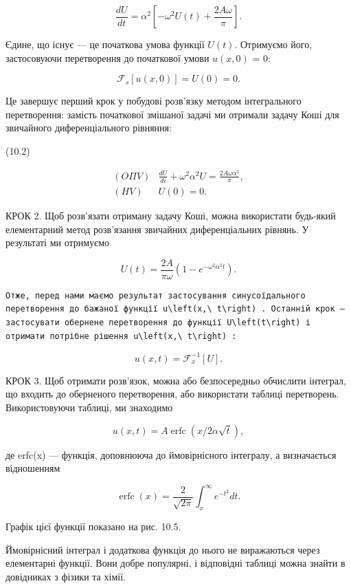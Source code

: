 \documentclass[
  ukrainian,
]{article}
\begin{document}
\[
\frac{dU}{dt} = \alpha^2 \left[ -\omega^2 U(t) + \frac{2A\omega}{\pi} \right].
\]

Єдине, що існує --- це початкова умова функції \(U(t)\). Отримуємо його,
застосовуючи перетворення до початкової умови \(u(x, 0)\) = 0:

\[
\mathcal{F}_{s}[u(x, 0)] = U(0) = 0.
\]

Це завершує перший крок у побудові розв'язку методом інтегрального
перетворення: замість початкової змішаної задачі ми отримали задачу Коші
для звичайного диференціального рівняння:

(10.2)

\[
\begin{aligned} (O \Pi V) & \frac{dU}{di} + \omega^2 \alpha^2 U = \frac{2A\omega \alpha^2}{\pi}, \\ (H V) & U(0) = 0. \end{aligned}
\]

КРОК 2. Щоб розв'язати отриману задачу Коші, можна використати будь-який
елементарний метод розв'язання звичайних диференціальних рівнянь. У
результаті ми отримуємо

\[
U(t) = \frac{2A}{\pi\omega} (1 - e^{-\omega^2 \alpha^2 t}).
\]

\begin{verbatim}
Отже, перед нами маємо результат застосування синусоїдального перетворення до бажаної функції u\left(x,\ t\right) . Останній крок — застосувати обернене перетворення до функції U\left(t\right) і отримати потрібне рішення u\left(x,\ t\right) :
\end{verbatim}

\[
u(x, t) = \mathcal{F}_{x}^{-1}[U].
\]

КРОК 3. Щоб отримати розв'язок, можна або безпосередньо обчислити
інтеграл, що входить до оберненого перетворення, або використати таблиці
перетворень. Використовуючи таблиці, ми знаходимо

\[
u(x, t) = A \operatorname{erfc}(x/2\alpha \sqrt{t}),
\]

де erfc(x) --- функція, доповнююча до ймовірнісного інтегралу, а
визначається відношенням

\[
\operatorname{erfc}(x) = \frac{2}{\sqrt{2\pi}} \int_{x}^{\infty} e^{-t^{2}} dt.
\]

Графік цієї функції показано на рис. 10.5.

Ймовірнісний інтеграл і додаткова функція до нього не виражаються через
елементарні функції. Вони добре популярні, і відповідні таблиці можна
знайти в довідниках з фізики та хімії.
\end{document}
